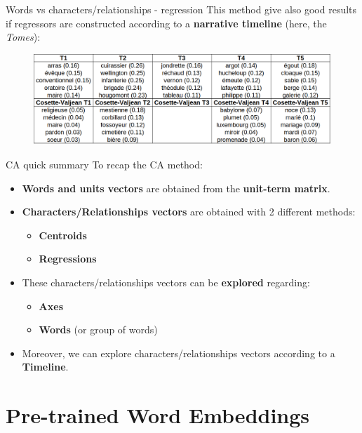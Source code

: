 \documentclass[10pt]{beamer}
\newcommand{\imp}[1]{\textbf{\color{cyan}#1}}
\begin{document}
	\begin{frame}{Words vs characters/relationships - regression}
		This method give also good results if regressors are constructed according to a \imp{narrative timeline} (here, the \emph{Tomes}):
		\vspace{-0.2cm}
		\begin{figure}
			\centering
			\includegraphics[width=\textwidth]{img/reg_vs_word_long.png}
		\end{figure}
	\end{frame}
	
	
	\begin{frame}{CA quick summary}
		To recap the CA method:
		\begin{itemize}
			\item \imp{Words and units vectors} are obtained from the \imp{unit-term matrix}.
			\item \imp{Characters/Relationships vectors} are obtained with 2 different methods:
			\begin{itemize}
				\item \imp{Centroids}
				\item \imp{Regressions}
			\end{itemize}
			\item These characters/relationships vectors can be \imp{explored} regarding:
			\begin{itemize}
				\item \imp{Axes}
				\item \imp{Words} (or group of words)
			\end{itemize}
			\item Moreover, we can explore characters/relationships vectors according to a \imp{Timeline}.
		\end{itemize}
	\end{frame}
	
	
	
	\section[Pre-trained Word Embeddings]{Pre-trained Word Embeddings}
	
\end{document}
